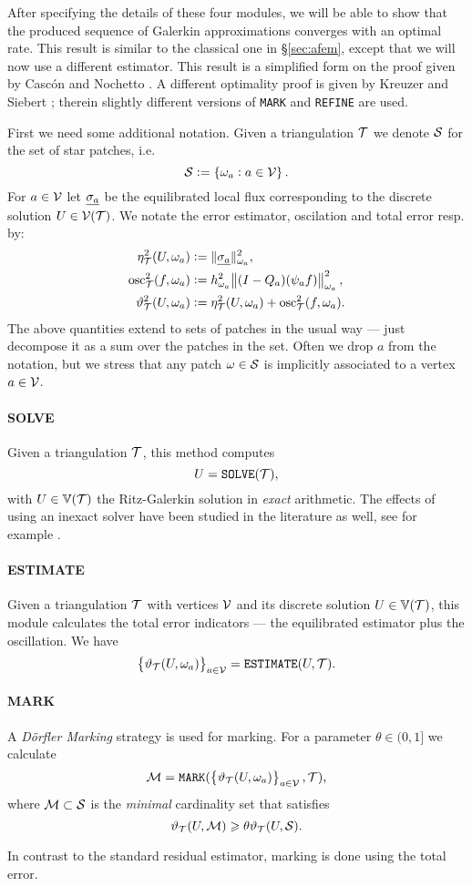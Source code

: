 \documentclass[thesis.tex]{subfiles}
\begin{document}
After specifying the details of these four modules, we will be able to show that the produced
sequence of Galerkin approximations converges with an optimal rate. This result
is similar to the classical one in \S\ref{sec:afem}, except that we will now use a different estimator. This
result is a simplified form on the proof given by Casc\'on and Nochetto \cite{cascon2012}.
A different optimality proof is given by Kreuzer and Siebert \cite{ainsworthbernstein}; therein
slightly different versions of \texttt{MARK} and \texttt{REFINE} are used.

First we need some additional notation. Given a triangulation $\mathcal{T}$ we denote $\mathcal{S}$ for the set of star patches, i.e. 
\[
  \mathcal{S} := \set{\omega_a : a \in \mathcal{V}}.
\]
For $a \in \mathcal{V}$ let $\underline{\sigma_a}$ be the equilibrated local flux corresponding to the discrete solution $U \in \mathcal{V}(\mathcal{T})$. We notate the
  error estimator, oscilation and total error resp. by:
\begin{align*}
  \eta^2_{\mathcal{T}}(U, \omega_a) &:= \| \underline{\sigma_a} \|^2_{\omega_a}, \\
  \operatorname{osc}^2_{\mathcal{T}}(f, \omega_a) &:=h^2_{\omega_a} \norm{(I - Q_a) (\psi_a f)}^2_{\omega_a}, \\
  \vartheta^2_{\mathcal{T}}(U, \omega_a) &:= \eta^2_{\mathcal{T}}(U, \omega_a) + \operatorname{osc}^2_{\mathcal{T}}(f, \omega_a).
\end{align*}
The above quantities extend to sets of patches in the usual way 
--- just decompose it as a sum over the patches in the set.
Often we drop $a$ from the notation, but we stress that any patch $\omega \in \mathcal{S}$ is implicitly
associated to a vertex $a \in \mathcal{V}$.


\paragraph{SOLVE}Given a triangulation $\mathcal{T}$, this method computes
\[
  U = \texttt{SOLVE}(\mathcal{T}),
\]
with $U \in \mathbb{V}(\mathcal{T})$ the  Ritz-Galerkin solution in \emph{exact} arithmetic. The effects of using an inexact solver have
been studied in the literature as well, see for example \cite[\S7]{carstensen2014axioms}.
\paragraph{ESTIMATE} Given a triangulation $\mathcal{T}$ with vertices $\mathcal{V}$ and its discrete solution $U \in \mathbb{V}(\mathcal{T})$, this module 
calculates the total error indicators --- the equilibrated estimator plus the oscillation. We have
\[
  \set{\vartheta_{\mathcal{T}}(U, \omega_a)}_{a \in \mathcal{V}} = \texttt{ESTIMATE}(U, \mathcal{T}).
\]
\paragraph{MARK}
A \emph{D\"orfler Marking} strategy is used for marking. For a parameter $\theta \in (0,1]$ we calculate
\[
  \mathcal{M} = \texttt{MARK}( \set{\vartheta_{\mathcal{T}}(U, \omega_a)}_{a \in \mathcal{V}}, \mathcal{T}),
\]
where $\mathcal{M} \subset \mathcal{S}$ is the \emph{minimal} cardinality set that satisfies
\[
  \vartheta_{\mathcal{T}}(U,\mathcal{M}) \geqslant \theta \vartheta_{\mathcal{T}}(U, \mathcal{S}).
\]
\begin{rem}
  In contrast to the standard residual estimator, marking is done using the total error.
\end{rem}
\end{document}
